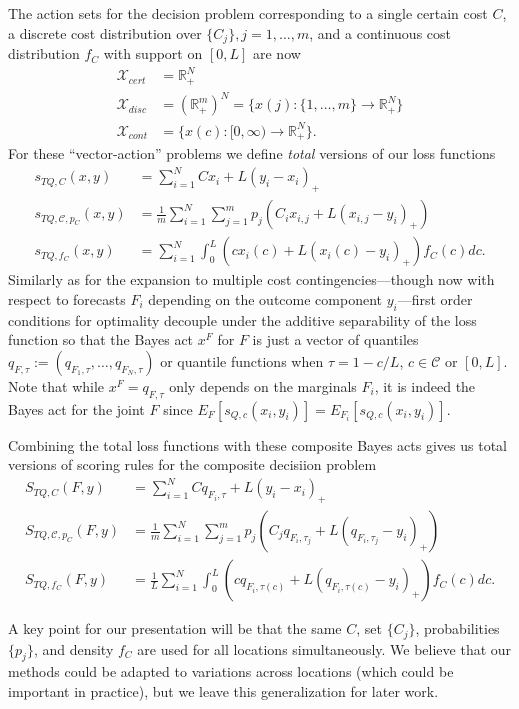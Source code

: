 \documentclass{article}
\begin{document}
The action sets for the decision problem corresponding to a single certain cost $C$, a discrete cost distribution over $\{C_j\}, j = 1,\ldots,m$, and a continuous cost distribution $f_C$ with support on $[0,L]$ are now
\begin{align}
\mathcal{X}_{cert} &= \mathbb{R}_{+}^N \\
\mathcal{X}_{disc} &= (\mathbb{R}_{+}^m)^N = \{x(j):\{1,\ldots,m\} \to \mathbb{R}_{+}^N\}\\
\mathcal{X}_{cont} &= \{x(c):[0,\infty) \to \mathbb{R}_{+}^N\}.
\end{align}
For these ``vector-action'' problems we define \emph{total} versions of our loss functions
\begin{align}
s_{TQ, C}(x,y) &= \sum_{i=1}^N Cx_i + L(y_i-x_i)_+ \label{eqn:TQ_loss} \\
s_{TQ, \mathcal{C}, p_C}(x,y) &= \frac{1}{m}\sum_{i=1}^N \sum_{j=1}^{m}p_j(C_i x_{i,j} + L(x_{i,j} - y_i)_+)\\
s_{TQ, f_C}(x,y) &= \sum_{i=1}^N \int_{0}^{L} (cx_i(c) + L(x_i(c) - y_i)_+) f_C(c)dc.
\end{align}
Similarly as for the expansion to multiple cost contingencies---though now with respect to forecasts $F_i$ depending on the 
outcome component $y_i$---first order conditions for optimality decouple under the additive separability of the loss function so that the Bayes act $x^F$ for $F$ is just a vector of quantiles $q_{F,\tau} := (q_{F_1,\tau},\ldots,q_{F_N,\tau})$ or quantile functions when $\tau = 1 - c/L$, $c \in \mathcal{C}$ or $[0,L]$. Note that while $x^F=q_{F,\tau}$ only depends on the marginals 
$F_i$, it is indeed the Bayes act for the joint $F$ since $E_F[s_{Q,c}(x_i, y_i)] = E_{F_i}[s_{Q,c}(x_i, y_i)]$.

Combining the total loss functions with these composite Bayes acts gives us total versions of scoring rules for the composite decisiion problem
\begin{align}
S_{TQ,C}(F,y) &= \sum_{i=1}^{N}Cq_{F_i,\tau} + L(y_i-x_i)_+ \\
S_{TQ,\mathcal{C}, p_C}(F,y) &= \frac{1}{m}\sum_{i=1}^{N}\sum_{j=1}^{m}p_j(C_j q_{F_i,\tau_j} + L(q_{F_i,\tau_j} - y_i)_+) \\
S_{TQ, f_C}(F,y) &= \frac{1}{L}\sum_{i=1}^{N}\int_{0}^{L}(cq_{F_i,\tau(c)} + L(q_{F_i,\tau(c)} - y_i)_+) f_C(c)dc.
\end{align}

A key point for our presentation will be that the same $C$, set $\{C_j\}$, probabilities $\{p_j\}$, and density $f_C$ are used for all locations simultaneously.  We believe that our methods could be adapted to variations across locations (which could be important in practice), but we leave this generalization for later work. 
\end{document}
